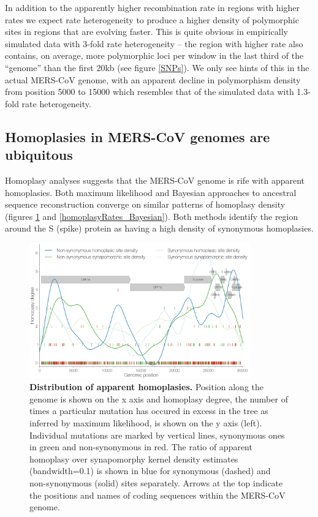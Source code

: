 \documentclass[11pt,oneside,letterpaper]{article}
\begin{document}
In addition to the apparently higher recombination rate in regions with higher rates we expect rate heterogeneity to produce a higher density of polymorphic sites in regions that are evolving faster.
This is quite obvious in empirically simulated data with 3-fold rate heterogeneity -- the region with higher rate also contains, on average, more polymorphic loci per window in the last third of the ``genome'' than the first 20kb (see figure \ref{SNPs}).
We only see hints of this in the actual MERS-CoV genome, with an apparent decline in polymorphism density from position 5000 to 15000 which resembles that of the simulated data with 1.3-fold rate heterogeneity.

\subsection*{Homoplasies in MERS-CoV genomes are ubiquitous}
Homoplasy analyses suggests that the MERS-CoV genome is rife with apparent homoplasies.
Both maximum likelihood and Bayesian approaches to ancestral sequence reconstruction converge on similar patterns of homoplasy density (figures \ref{homoplasy_densities} and \ref{homoplasyRates_Bayesian}).
Both methods identify the region around the S (spike) protein as having a high density of synonymous homoplasies.

\begin{figure}[h]
	\centering
	\includegraphics[width=0.85\textwidth]{figures/MERS_ML_homoplasyRate.png}
	\caption{\textbf{Distribution of apparent homoplasies.}
Position along the genome is shown on the x axis and homoplasy degree, the number of times a particular mutation has occured in excess in the tree as inferred by maximum likelihood, is shown on the y axis (left).
Individual mutations are marked by vertical lines, synonymous ones in green and non-synonymous in red.
The ratio of apparent homoplasy over synapomorphy kernel density estimates (bandwidth=0.1) is shown in blue for synonymous (dashed) and non-synonymous (solid) sites separately.
Arrows at the top indicate the positions and names of coding sequences within the MERS-CoV genome.}
	\label{homoplasy_densities}
\end{figure}
\end{document}
